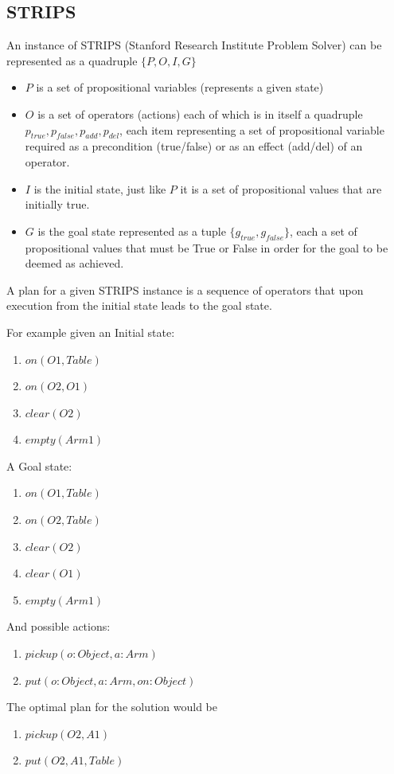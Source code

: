 \subsection{STRIPS}
An instance of STRIPS (Stanford Research Institute Problem Solver) can be represented as a quadruple \(\{P,O,I,G\}\)
\begin{itemize}
    \item \(P\) is a set of propositional variables (represents a given state)
    \item \(O\) is a set of operators (actions) each of which is in itself a quadruple \(p_{true},p_{false},p_{add},p_{del}\), each item representing a set of propositional variable required as a precondition (true/false) or as an effect (add/del) of an operator.
    \item \(I\) is the initial state, just like \(P\) it is a set of propositional values that are initially true.
    \item \(G\) is the goal state represented as a tuple \(\{g_{true},g_{false}\}\), each a set of propositional values that must be True or False in order for the goal to be deemed as achieved.
\end{itemize}
A plan for a given STRIPS instance is a sequence of operators that upon execution from the initial state leads to the goal state.

For example given an Initial state:
\begin{enumerate}
    \item \(on(O1,Table)\)
    \item \(on(O2,O1)\)
    \item \(clear(O2)\)
    \item \(empty(Arm1)\)
\end{enumerate}
A Goal state:
\begin{enumerate}
    \item \(on(O1,Table)\)
    \item \(on(O2,Table)\)
    \item \(clear(O2)\)
    \item \(clear(O1)\)
    \item \(empty(Arm1)\)
\end{enumerate}
And possible actions:
\begin{enumerate}
    \item \(pickup(o:Object, a:Arm)\)
    \item \(put(o:Object,a:Arm,on:Object)\)
\end{enumerate}
The optimal plan for the solution would be
\begin{enumerate}
    \item \(pickup(O2, A1)\)
    \item \(put(O2, A1, Table)\)
\end{enumerate}

